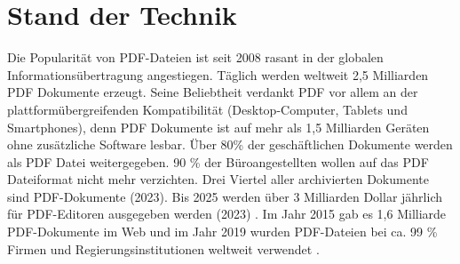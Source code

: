 \chapter{Stand der Technik}
Die Popularität von PDF-Dateien ist seit 2008 rasant in der globalen Informationsübertragung angestiegen. Täglich werden weltweit 2,5 Milliarden PDF Dokumente erzeugt. Seine Beliebtheit verdankt PDF vor allem an der plattformübergreifenden Kompatibilität (Desktop-Computer, Tablets und Smartphones), denn PDF Dokumente ist auf mehr als 1,5 Milliarden Geräten ohne zusätzliche Software lesbar. Über 80\% der geschäftlichen Dokumente werden als PDF Datei weitergegeben. \cite{formilo} 90 \% der Büroangestellten wollen auf das PDF Dateiformat nicht mehr verzichten. Drei Viertel aller archivierten Dokumente sind PDF-Dokumente (2023). Bis 2025 werden über 3 Milliarden Dollar jährlich für PDF-Editoren ausgegeben werden (2023) \cite{kofax}. Im Jahr 2015 gab es 1,6 Milliarde PDF-Dokumente im Web und im Jahr 2019 wurden PDF-Dateien bei ca. 99 \% Firmen und Regierungsinstitutionen weltweit verwendet \cite{ccc-break-pdf}.









